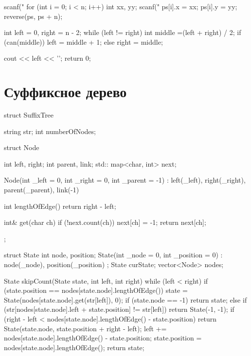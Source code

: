 \documentclass[12pt, titlepage]{article}
\begin{document}
\begin{cppcode}
{    scanf("%
    for (int i = 0; i < n; i++) {
        int xx, yy;
        scanf("%
        ps[i].x = xx;
        ps[i].y = yy;
    }
    reverse(ps, ps + n);
   
    int left = 0, right = n - 2;
    while (left != right) {
        int middle =(left + right) / 2;
        if (can(middle))
            left = middle + 1;
        else
            right = middle;
    }

    cout << left << '\n';
    return 0;
}
\end{cppcode}
\section{Суффиксное дерево}
\begin{cppcode}
struct SuffixTree {
    string str;
    int numberOfNodes;

    struct Node {
        int left, right;
        int parent, link;
        std:: map<char, int> next;

        Node(int _left = 0, int _right = 0, int _parent = -1) : left(_left), 
                                right(_right), parent(_parent), link(-1) {}

        int lengthOfEdge() {
            return right - left;  
        }
        
        int& get(char ch) {
            if (!next.count(ch))
                next[ch] = -1;
            return next[ch];
        }    
    };    

    struct State {
        int node, position;
        State(int _node = 0, int _position = 0) : node(_node), position(_position) {}
    };
    State curState;
    vector<Node> nodes;

    State skipCount(State state, int left, int right) {
        while (left < right) {
            if (state.position == nodes[state.node].lengthOfEdge()) {
                state = State(nodes[state.node].get(str[left]), 0);
                if (state.node == -1)
                    return state;
            }
            else {
                if (str[nodes[state.node].left + state.position] != str[left])
                    return State(-1, -1);
                if (right - left < nodes[state.node].lengthOfEdge() - state.position)
                    return State(state.node, state.position + right - left);
                left += nodes[state.node].lengthOfEdge() - state.position;
                state.position = nodes[state.node].lengthOfEdge();
            }
        }
        return state;
    }

}
\end{cppcode}
\end{document}
